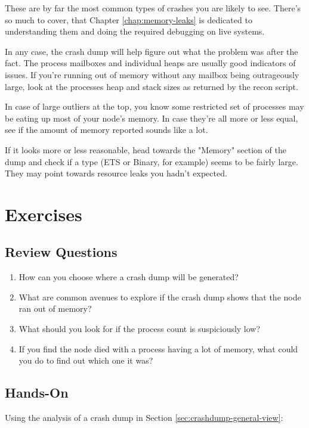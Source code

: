 \documentclass[11pt, oneside]{book}   	%
\begin{document}
These are by far the most common types of crashes you are likely to see. There's so much to cover, that Chapter \ref{chap:memory-leaks} is dedicated to understanding them and doing the required debugging on live systems.

In any case, the crash dump will help figure out what the problem was after the fact. The process mailboxes and individual heaps are usually good indicators of issues. If you're running out of memory without any mailbox being outrageously large, look at the processes heap and stack sizes as returned by the recon script.

In case of large outliers at the top, you know some restricted set of processes may be eating up most of your node's memory. In case they're all more or less equal, see if the amount of memory reported sounds like a lot.

If it looks more or less reasonable, head towards the "Memory" section of the dump and check if a type (ETS or Binary, for example) seems to be fairly large. They may point towards resource leaks you hadn't expected.


\section{Exercises}

\subsection{Review Questions}

\begin{enumerate}
	\item How can you choose where a crash dump will be generated?
	\item What are common avenues to explore if the crash dump shows that the node ran out of memory?
	\item What should you look for if the process count is suspiciously low?
	\item If you find the node died with a process having a lot of memory, what could you do to find out which one it was?\end{enumerate}

\subsection{Hands-On}

Using the analysis of a crash dump in Section \ref{sec:crashdump-general-view}:
\end{document}
